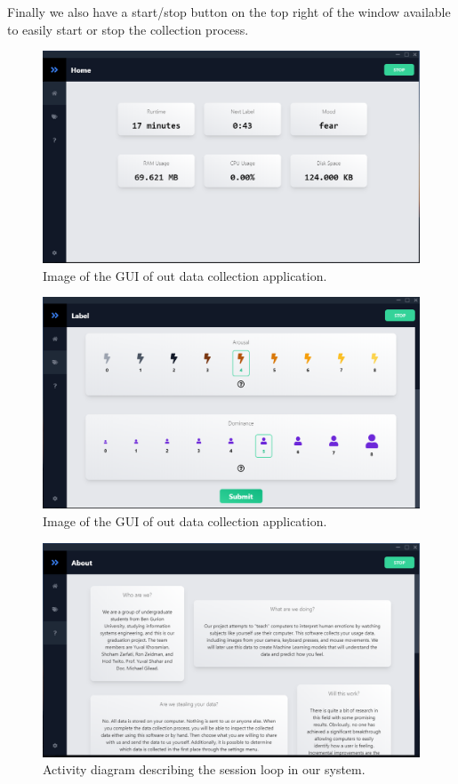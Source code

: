 \documentclass[../main.tex]{subfiles}
\begin{document}
Finally we also have a start/stop button on the top right of the window available to easily start or stop the collection process.

\begin{figure}[htp]
    \centering
    \includegraphics[width=14cm]{figures/ui_home}   
    \caption{Image of the GUI of out data collection application.}
    \label{fig:ui_home} 
\end{figure}

\begin{figure}[htp]
    \centering
    \includegraphics[width=14cm]{figures/ui_label}   
    \caption{Image of the GUI of out data collection application.}
    \label{fig:ui_label} 
\end{figure}

\begin{figure}[htp]
    \centering
    \includegraphics[width=14cm]{figures/ui_about}   
    \caption{Activity diagram describing the session loop in our system.}
    \label{fig:ui_about} 
\end{figure}
\end{document}
